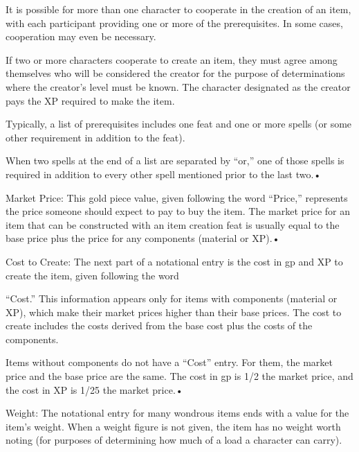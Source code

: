 It is possible for more than one character to cooperate in the creation of an item, 
with each participant providing one or more of the prerequisites. In some cases, 
cooperation may even be necessary.

If two or more characters cooperate to create an item, they must agree among themselves 
who will be considered the creator for the purpose of determinations where the 
creator's level must be known. The character designated as the creator pays the 
XP required to make the item.

Typically, a list of prerequisites includes one feat and one or more spells (or 
some other requirement in addition to the feat).

When two spells at the end of a list are separated by ``or,'' one of those spells 
is required in addition to every other spell mentioned prior to the last two.•

Market Price: This gold piece value, given following the word ``Price,'' represents 
the price someone should expect to pay to buy the item. The market price for an 
item that can be constructed with an item creation feat is usually equal to the 
base price plus the price for any components (material or XP).•

Cost to Create: The next part of a notational entry is the cost in gp and XP to 
create the item, given following the word

``Cost.'' This information appears only for items with components (material or 
XP), which make their market prices higher than their base prices. The cost to 
create includes the costs derived from the base cost plus the costs of the components.

Items without components do not have a ``Cost'' entry. For them, the market price 
and the base price are the same. The cost in gp is 1/2 the market price, and the 
cost in XP is 1/25 the market price.•

Weight: The notational entry for many wondrous items ends with a value for the 
item's weight. When a weight figure is not given, the item has no weight worth 
noting (for purposes of determining how much of a load a character can carry).

